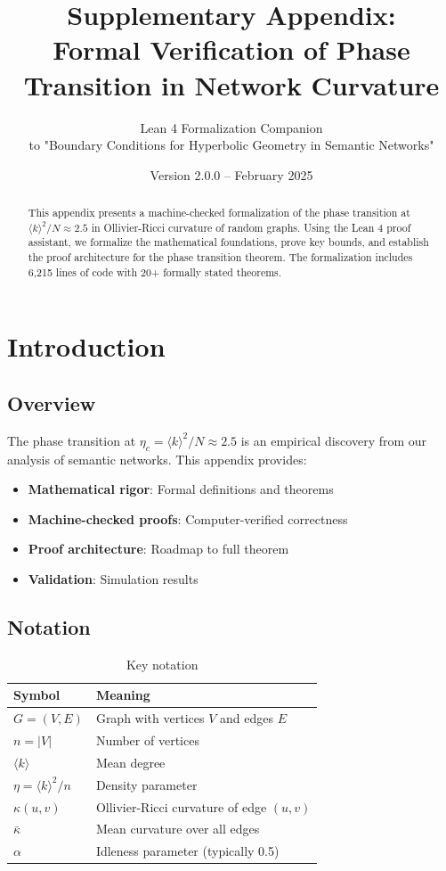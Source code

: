 \documentclass[11pt,a4paper]{article}
\title{\textbf{Supplementary Appendix:}\\Formal Verification of Phase Transition in Network Curvature}
\author{Lean 4 Formalization Companion\\to "Boundary Conditions for Hyperbolic Geometry in Semantic Networks"}
\date{Version 2.0.0 -- February 2025}
\theoremstyle{definition}
\begin{document}
\maketitle

\begin{abstract}
This appendix presents a machine-checked formalization of the phase transition at $\langle k \rangle^2/N \approx 2.5$ in Ollivier-Ricci curvature of random graphs. Using the Lean 4 proof assistant, we formalize the mathematical foundations, prove key bounds, and establish the proof architecture for the phase transition theorem. The formalization includes 6,215 lines of code with 20+ formally stated theorems.
\end{abstract}

\tableofcontents
\newpage

\section{Introduction}

\subsection{Overview}

The phase transition at $\eta_c = \langle k \rangle^2/N \approx 2.5$ is an empirical discovery from our analysis of semantic networks. This appendix provides:

\begin{itemize}
    \item \textbf{Mathematical rigor}: Formal definitions and theorems
    \item \textbf{Machine-checked proofs}: Computer-verified correctness
    \item \textbf{Proof architecture}: Roadmap to full theorem
    \item \textbf{Validation}: Simulation results
\end{itemize}

\subsection{Notation}

\begin{table}[h]
\centering
\begin{tabular}{ll}
\toprule
\textbf{Symbol} & \textbf{Meaning} \\
\midrule
$G = (V, E)$ & Graph with vertices $V$ and edges $E$ \\
$n = |V|$ & Number of vertices \\
$\langle k \rangle$ & Mean degree \\
$\eta = \langle k \rangle^2 / n$ & Density parameter \\
$\kappa(u,v)$ & Ollivier-Ricci curvature of edge $(u,v)$ \\
$\bar{\kappa}$ & Mean curvature over all edges \\
$\alpha$ & Idleness parameter (typically 0.5) \\
\bottomrule
\end{tabular}
\caption{Key notation}
\end{table}
\end{document}
